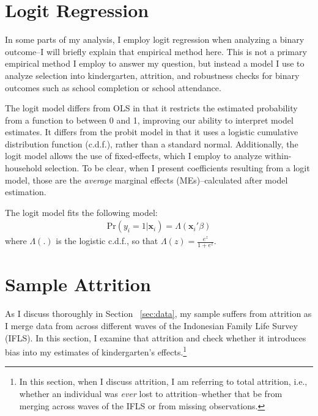 \section{Logit Regression}
	\label{app:logit}
In some parts of my analysis, I employ logit regression when analyzing a binary outcome--I will briefly explain that empirical method here. This is not a primary empirical method I employ to answer my question, but instead a model I use to analyze selection into kindergarten, attrition, and robustness checks for binary outcomes such as school completion or school attendance. 

The logit model differs from OLS in that it restricts the estimated probability from a function to between 0 and 1, improving our ability to interpret model estimates. It differs from the probit model in that it uses a logistic cumulative distribution function (c.d.f.), rather than a standard normal. Additionally, the logit model allows the use of fixed-effects, which I employ to analyze within-household selection. To be clear, when I present coefficients resulting from a logit model, those are the \textit{average} marginal effects (MEs)--calculated after model estimation. 

The logit model fits the following model:
\begin{gather}
	\text{Pr}(y_i = 1 | \mathbf{x}_i) = \Lambda(\mathbf{x}_i' \beta)
\end{gather}
where $\Lambda(.)$ is the logistic c.d.f., so that $\Lambda(z) = \frac{e^z}{1+e^z}$.

\section{Sample Attrition}
	\label{app:attrition}
As I discuss thoroughly in Section ~\ref{sec:data}, my sample suffers from attrition as I merge data from across different waves of the Indonesian Family Life Survey (IFLS). In this section, I examine that attrition and check whether it introduces bias into my estimates of kindergarten's effects.\footnote{In this section, when I discuss attrition, I am referring to total attrition, i.e., whether an individual was \textit{ever} lost to attrition--whether that be from merging across waves of the IFLS or from missing observations.}

